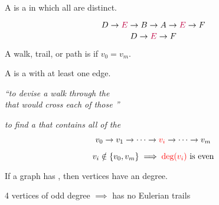 \begin{frame}{}
  \begin{definition}[Path (路径)]
    A  is a  in which all  are distinct.
  \end{definition}

  \pause
  \[
    D \to \textcolor{purple}{E} \to B \to A \to \textcolor{purple}{E} \to F
  \]
  \[
    D \to \textcolor{purple}{E} \to F
  \]
\end{frame}

\begin{frame}{}
  \begin{definition}
    A walk, trail, or path is  if $v_{0} = v_{m}$.
  \end{definition}

  \pause

  \pause
  \begin{definition}[Cycle]
    A  is a  with at least one edge.
  \end{definition}
\end{frame}

\begin{frame}{}
  \begin{center}
    {\it ``to devise a walk through the  \\
    that would cross each of those  ''}


    \pause
    {\it to find a  that contains all  of the }
  \end{center}
\end{frame}

\begin{frame}{}
  \[
    v_{0} \to v_{1} \to \dots \to \textcolor{red}{v_{i}} \to \dots \to v_{m}
  \]


  \pause
  \vspace{-0.50cm}
  \[
    v_{i} \notin \{v_{0}, v_{m}\} \implies
    \textcolor{red}{\text{deg}(v_{i})} \text{ is even}
  \]
\end{frame}

\begin{frame}{}
  \begin{lemma}
    If a graph has ,
    then  vertices have an  degree.
  \end{lemma}

  \pause

  \pause
  \begin{center}
    4 vertices of odd degree $\implies$ has no Eulerian trails
  \end{center}
\end{frame}

